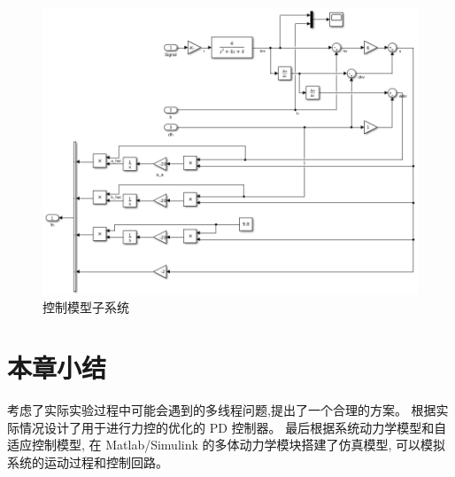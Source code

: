 \begin{figure}[!ht]
  \centering
  \includegraphics[scale=0.6]{chapter03/pic/3-6}
  \caption{控制模型子系统}
  \label{fig:3-6}
  \vspace{-0.3cm}
\end{figure}

\section{本章小结}
考虑了实际实验过程中可能会遇到的多线程问题,提出了一个合理的方案。
根据实际情况设计了用于进行力控的优化的 PD 控制器。
最后根据系统动力学模型和自适应控制模型,
在 Matlab/Simulink 的多体动力学模块搭建了仿真模型,
可以模拟系统的运动过程和控制回路。

